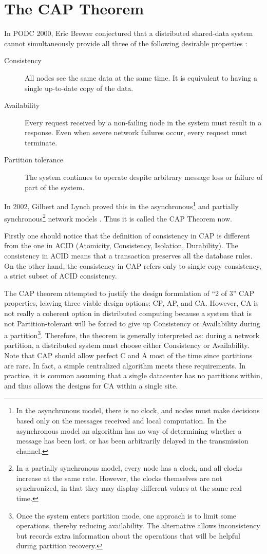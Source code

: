 \documentclass[11pt]{book}
\begin{document}
\section[The CAP Theorem]
{The CAP Theorem} \label{sec:cap}
In PODC 2000, Eric Brewer conjectured that a distributed shared-data system cannot simultaneously provide all three of the following desirable properties \cite{Brewer:2000:TRD}:
\begin{description}
\item[Consistency] All nodes see the same data at the same time. It is equivalent to having a single up-to-date copy of the data.
\item[Availability] Every request received by a non-failing node in the system must result in a response. Even when severe network failures occur, every request must terminate.
\item[Partition tolerance] The system continues to operate despite arbitrary message loss or failure of part of the system.
\end{description}
In 2002, Gilbert and Lynch proved this in the asynchronous\footnote{In the asynchronous model, there is no clock, and nodes must make decisions based only on the messages received and local computation. In the asynchronous model an algorithm has no way of determining whether a message has been lost, or has been arbitrarily delayed in the transmission channel.} and partially synchronous\footnote{In a partially synchronous model, every node has a clock, and all clocks increase at the same rate. However, the clocks themselves are not synchronized, in that they may display different values at the same real time.} network models \cite{Gilbert:2002:BCF}. Thus it is called the CAP Theorem now.

Firstly one should notice that the definition of consistency in CAP is different from the one in ACID (Atomicity, Consistency, Isolation, Durability). The consistency in ACID means that a transaction preserves all the database rules. On the other hand, the consistency in CAP refers only to single copy consistency, a strict subset of ACID consistency. 

The CAP theorem attempted to justify the design formulation of ``2 of 3'' CAP properties, leaving three viable design options: CP, AP, and CA. However, CA is not really a coherent option in distributed computing because a system that is not Partition-tolerant will be forced to give up Consistency or Availability during a partition\footnote{Once the system enters partition mode, one approach is to limit some operations, thereby reducing availability. The alternative allows inconsistency but records extra information about the operations that will be helpful during partition recovery.}. Therefore, the theorem is generally interpreted as: during a network partition, a distributed system must choose either Consistency or Availability. Note that CAP should allow perfect C and A most of the time since partitions are rare. In fact, a simple centralized algorithm meets these requirements. In practice, it is common assuming that a single datacenter has no partitions within, and thus allows the designs for CA within a single site.
\end{document}

